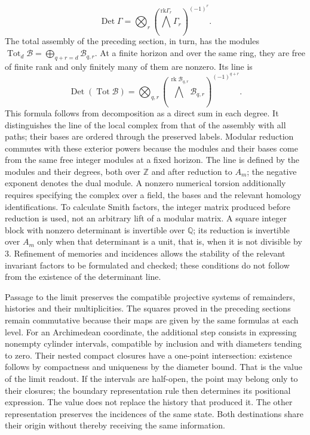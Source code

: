 \[
\operatorname{Det}\Gamma=
\bigotimes_r\left(\bigwedge^{\mathrm{rk}\Gamma_r}\Gamma_r\right)^{(-1)^r}.
\]
The total assembly of the preceding section, in turn, has the modules \(\operatorname{Tot}_d\mathcal B=\bigoplus_{q+r=d}\mathcal B_{q,r}\). At a finite horizon and over the same ring, they are free of finite rank and only finitely many of them are nonzero. Its line is
\[
\operatorname{Det}(\operatorname{Tot}\mathcal B)=
\bigotimes_{q,r}
\left(\bigwedge^{\operatorname{rk}\mathcal B_{q,r}}
\mathcal B_{q,r}\right)^{(-1)^{q+r}}.
\]
This formula follows from decomposition as a direct sum in each degree. It distinguishes the line of the local complex from that of the assembly with all paths; their bases are ordered through the preserved labels. Modular reduction commutes with these exterior powers because the modules and their bases come from the same free integer modules at a fixed horizon.
The line is defined by the modules and their degrees, both over \(\mathbb Z\) and after reduction to \(A_m\); the negative exponent denotes the dual module. A nonzero numerical torsion additionally requires specifying the complex over a field, the bases and the relevant homology identifications. To calculate Smith factors, the integer matrix produced before reduction is used, not an arbitrary lift of a modular matrix. A square integer block with nonzero determinant is invertible over \(\mathbb Q\); its reduction is invertible over \(A_m\) only when that determinant is a unit, that is, when it is not divisible by \(3\). Refinement of memories and incidences allows the stability of the relevant invariant factors to be formulated and checked; these conditions do not follow from the existence of the determinant line.

Passage to the limit preserves the compatible projective systems of remainders, histories and their multiplicities. The squares proved in the preceding sections remain commutative because their maps are given by the same formulas at each level. For an Archimedean coordinate, the additional step consists in expressing nonempty cylinder intervals, compatible by inclusion and with diameters tending to zero. Their nested compact closures have a one-point intersection: existence follows by compactness and uniqueness by the diameter bound. That is the value of the limit readout. If the intervals are half-open, the point may belong only to their closures; the boundary representation rule then determines its positional expression. The value does not replace the history that produced it. The other representation preserves the incidences of the same state. Both destinations share their origin without thereby receiving the same information.


